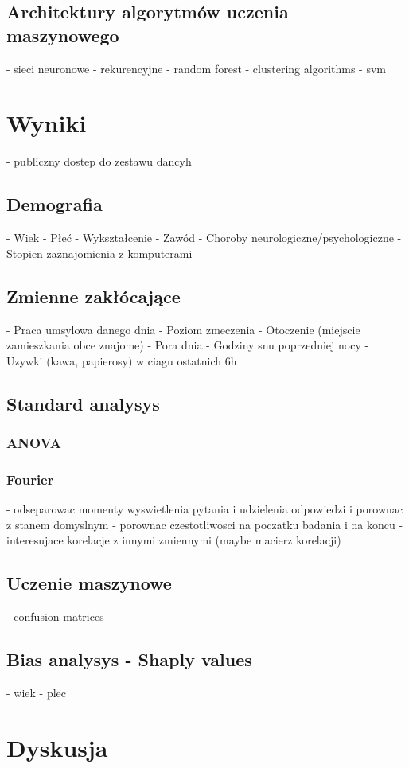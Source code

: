\documentclass{./assets/wfis}
\begin{document}
\section{Architektury algorytmów uczenia maszynowego}
- sieci neuronowe
    - rekurencyjne 
- random forest
- clustering algorithms
- svm

\chapter{Wyniki}
- publiczny dostep do zestawu dancyh
\section{Demografia}
- Wiek
- Płeć
- Wykształcenie
- Zawód
- Choroby neurologiczne/psychologiczne
- Stopien zaznajomienia z komputerami
\section{Zmienne zakłócające}\label{zmiennne-zaklucajace}
- Praca umsylowa danego dnia
- Poziom zmeczenia
- Otoczenie (miejscie zamieszkania obce znajome)
- Pora dnia
- Godziny snu poprzedniej nocy
- Uzywki (kawa, papierosy) w ciagu ostatnich 6h
\section{Standard analysys}\label{analiza-klasyczna}
\subsection{ANOVA}
\subsection{Fourier}
- odseparowac momenty wyswietlenia pytania i udzielenia odpowiedzi i porownac z stanem domyslnym
- porownac czestotliwosci na poczatku badania i na koncu
- interesujace korelacje z innymi zmiennymi (maybe macierz korelacji)
\section{Uczenie maszynowe}\label{uczenie-maszynowe}
- confusion matrices
\section{Bias analysys - Shaply values}\label{bias}
- wiek
- plec

\chapter{Dyskusja}\label{dyskusja}
\end{document}
